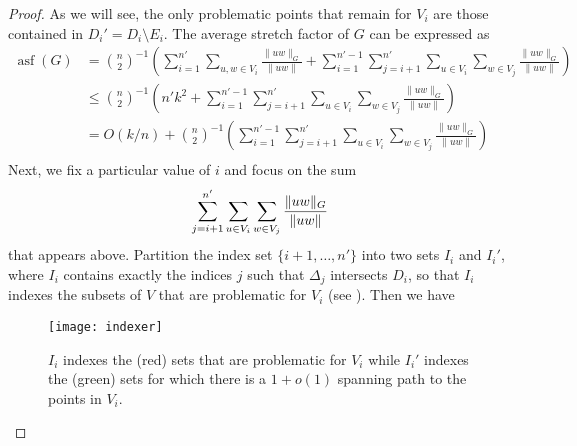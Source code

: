 \documentclass{patmorin}
\DeclareMathOperator{\asf}{asf}
\begin{document}
\begin{proof}
  As we will see, the only problematic points that remain for $V_i$
  are those contained in $D_i'=D_i\setminus E_i$.  The average stretch
  factor of $G$ can be expressed as
  \begin{align*}
    \asf(G) 
      & = 
      \binom n2^{-1}\left(
        \sum_{i=1}^{n'}\sum_{u,w\in V_i}\frac{\|uw\|_G}{\|uw\|}  
         + \sum_{i=1}^{n'-1}\sum_{j={i+1}}^{n'}
            \sum_{u\in V_i}\sum_{w\in V_j}\frac{\|uw\|_G}{\|uw\|}
      \right)  \\
      & \le 
         \binom n2^{-1}\left(n'k^2 
          + \sum_{i=1}^{n'-1}\sum_{j={i+1}}^{n'}
           \sum_{u\in V_i}\sum_{w\in V_j}\frac{\|uw\|_G}{\|uw\|}
      \right)  \\
      & = 
         O(k/n) + \binom n2^{-1}\left(  
          \sum_{i=1}^{n'-1}\sum_{j={i+1}}^{n'}
           \sum_{u\in V_i}\sum_{w\in V_j}\frac{\|uw\|_G}{\|uw\|}
      \right)  \\
   \end{align*}
   Next, we fix a particular value of $i$ and focus on the sum
   \begin{equation}
       \sum_{j={i+1}}^{n'}
          \sum_{u\in V_i}\sum_{w\in V_j}\frac{\|uw\|_G}{\|uw\|}
          \eqlabel{blah}
   \end{equation}
   that appears above.  Partition the index set $\{i+1,\ldots,n'\}$
   into two sets $I_i$ and $I_i'$, where $I_i$ contains exactly the
   indices $j$ such that $\Delta_j$ intersects $D_i$, so that $I_i$
   indexes the subsets of $V$ that are problematic for $V_i$ (see ). 
   Then we have

   \begin{figure}
    \begin{center}
      \texttt{[image: indexer]}
    \end{center}
    \caption{$I_i$ indexes the (red) sets that are problematic for $V_i$
     while $I_i'$ indexes the (green) sets for which there is a $1+o(1)$
     spanning path to the points in $V_i$.}
  \end{figure}



\end{proof}
\end{document}
